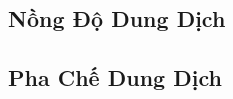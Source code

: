 \documentclass{article}
\numberwithin{equation}{section}
\begin{document}

\subsection{Nồng Độ Dung Dịch}


\subsection{Pha Chế Dung Dịch}


\printbibliography[heading=bibintoc]
	
\end{document}
